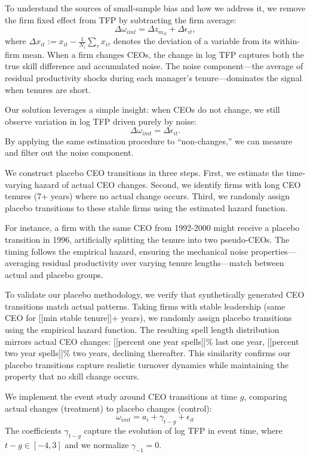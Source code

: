 \documentclass[11pt,a4paper]{article}
\begin{document}
To understand the sources of small-sample bias and how we address it, we remove the firm fixed effect from TFP by subtracting the firm average:
\begin{equation}
\Delta\omega_{imt} = \Delta z_{m_{it}} + \Delta\epsilon_{it},
\end{equation}
where $\Delta x_{it} := x_{it} - \frac{1}{N_i}\sum_{\tau} x_{i\tau}$ denotes the deviation of a variable from its within-firm mean. When a firm changes CEOs, the change in log TFP captures both the true skill difference and accumulated noise. The noise component---the average of residual productivity shocks during each manager's tenure---dominates the signal when tenures are short. 

Our solution leverages a simple insight: when CEOs do not change, we still observe variation in log TFP driven purely by noise:
\begin{equation}
\Delta\omega_{imt} = \Delta\epsilon_{it}.
\end{equation}
By applying the same estimation procedure to ``non-changes,'' we can measure and filter out the noise component.

We construct placebo CEO transitions in three steps. First, we estimate the time-varying hazard of actual CEO changes. Second, we identify firms with long CEO tenures (7+ years) where no actual change occurs. Third, we randomly assign placebo transitions to these stable firms using the estimated hazard function.

For instance, a firm with the same CEO from 1992-2000 might receive a placebo transition in 1996, artificially splitting the tenure into two pseudo-CEOs. The timing follows the empirical hazard, ensuring the mechanical noise properties—averaging residual productivity over varying tenure lengths—match between actual and placebo groups.

To validate our placebo methodology, we verify that synthetically generated CEO transitions match actual patterns. Taking firms with stable leadership (same CEO for [[min stable tenure]]+ years), we randomly assign placebo transitions using the empirical hazard function. The resulting spell length distribution mirrors actual CEO changes: [[percent one year spells]]\% last one year, [[percent two year spells]]\% two years, declining thereafter. This similarity confirms our placebo transitions capture realistic turnover dynamics while maintaining the property that no skill change occurs.

We implement the event study around CEO transitions at time $g$, comparing actual changes (treatment) to placebo changes (control):
\begin{equation}
\omega_{imt} = a_i + \gamma_{t-g} + \epsilon_{it}
\end{equation}
The coefficients $\gamma_{t-g}$ capture the evolution of log TFP in event time, where $t-g \in [-4, 3]$ and we normalize $\gamma_{-1} = 0$.
\end{document}
